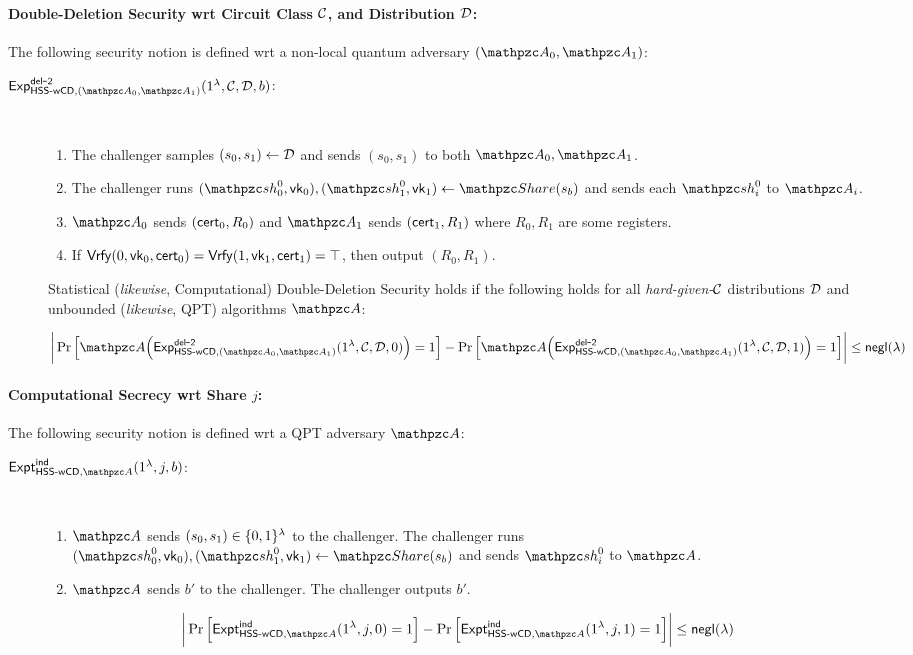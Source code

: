 \paragraph{Double-Deletion Security wrt Circuit Class $\mathcal{C}$, and
Distribution $\mathcal{D}$:}

The following security notion is defined wrt a non-local quantum
adversary $(\qA_0, \qA_1)$:

\begin{description}
\item [$\expb{\HSSwcd, (\qA_0, \qA_1)}{del}{2}(1^\secp,
\calC, \calD, b)$:]
$ $
\begin{enumerate}
\item The challenger samples $(s_0, s_1) \leftarrow \mathcal{D}$ and
sends $(s_0, s_1)$ to both $\qA_0, \qA_1$.
\item The challenger runs
$(\qsh_0^0, \vk_0), (\qsh_1^0, \vk_1) \gets \Sh(s_b)$ and sends each
$\qsh_i^0$ to $\qA_i$.

\item $\qA_0$ sends $(\mathsf{cert}_0, R_0)$ and $\qA_{1}$ sends
$(\mathsf{cert}_{1}, R_{1})$ where $R_0, R_1$ are some registers.
\item If $\mathsf{Vrfy}(0, \mathsf{vk}_0, \mathsf{cert}_0) = \mathsf{Vrfy}(1, \mathsf{vk}_1, \mathsf{cert}_1)=
\top$, then output $(R_0, R_1)$.
\end{enumerate}

Statistical (\emph{likewise}, Computational) Double-Deletion
Security holds
if the following holds for all \emph{hard-given-$\mathcal{C}$}
distributions $\mathcal{D}$ and unbounded (\emph{likewise}, QPT)
algorithms $\qA$:

$$\bigg\lvert \Pr\Big[\qA\Big(\expb{\HSSwcd, (\qA_0,
\qA_1)}{del}{2}(1^\secp, \calC, \calD, 0)\Big)=1\Big] -
\Pr\Big[\qA\Big(\expb{\HSSwcd, (\qA_0,
\qA_1)}{del}{2}(1^\secp, \calC, \calD, 1)\Big)=1\Big]
\bigg\rvert \le \negl(\secp)$$
\end{description}

\paragraph{Computational Secrecy wrt Share $j$:}

The following security notion is defined wrt a QPT
adversary $\qA$:

\begin{description}
\item [$\expa{\HSSwcd, \qA}{ind}(1^\secp, j, b)$:] $ $
\begin{enumerate}
\item $\qA$ sends $(s_0, s_1) \in \{0,1\}^\lambda$
to the challenger. The challenger runs $(\qsh_0^0, \vk_0),
(\qsh_1^0, \vk_1) \leftarrow \Sh(s_b)$ and sends $\qsh_i^0$ to
$\qA$.
\item
$\qA$ sends $b'$ to the challenger. The challenger outputs $b'$.
\end{enumerate}

$$\bigg\lvert \Pr\Big[\expa{\HSSwcd, \qA}{ind}(1^\secp, j, 0)=1\Big]
-
\Pr\Big[\expa{\HSSwcd, \qA}{ind}(1^\secp, j, 1)=1\Big]
\bigg\rvert \le \negl(\secp)$$
\end{description}




